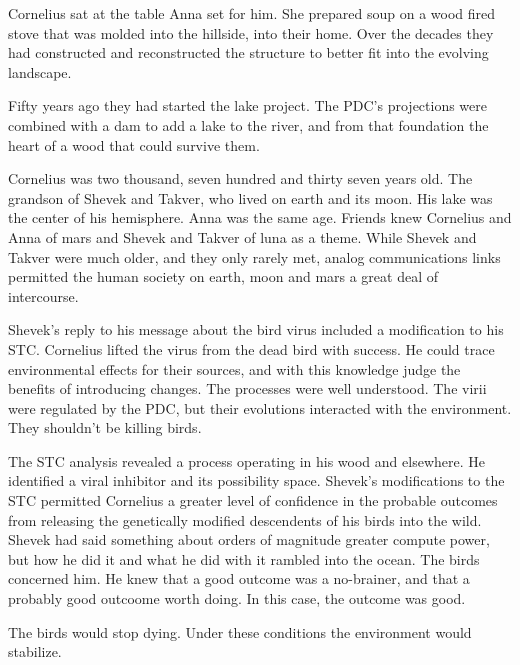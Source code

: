 Cornelius sat at the table Anna set for him.  She prepared soup on a
wood fired stove that was molded into the hillside, into their home.
Over the decades they had constructed and reconstructed the structure
to better fit into the evolving landscape.  

Fifty years ago they had started the lake project.  The PDC's projections
were combined with a dam to add a lake to the river, and from that
foundation the heart of a wood that could survive them.

\bigskip

Cornelius was two thousand, seven hundred and thirty seven years old.
The grandson of Shevek and Takver, who lived on earth and its moon.
His lake was the center of his hemisphere.  Anna was the same age.
Friends knew Cornelius and Anna of mars and Shevek and Takver of luna
as a theme.  While Shevek and Takver were much older, and they only
rarely met, analog communications links permitted the human society on
earth, moon and mars a great deal of intercourse.

\bigskip

Shevek's reply to his message about the bird virus included a
modification to his STC.  Cornelius lifted the virus from the dead
bird with success.  He could trace environmental effects for their
sources, and with this knowledge judge the benefits of introducing
changes.  The processes were well understood.  The virii were
regulated by the PDC, but their evolutions interacted with the
environment.  They shouldn't be killing birds.

The STC analysis revealed a process operating in his wood and
elsewhere.  He identified a viral inhibitor and its possibility space.
Shevek's modifications to the STC permitted Cornelius a greater level
of confidence in the probable outcomes from releasing the genetically
modified descendents of his birds into the wild.  Shevek had said
something about orders of magnitude greater compute power, but how he
did it and what he did with it rambled into the ocean.  The birds
concerned him.  He knew that a good outcome was a no-brainer, and that
a probably good outcoome worth doing.  In this case, the outcome was
good.  

The birds would stop dying.  Under these conditions the environment
would stabilize.

\bigskip



\bye
